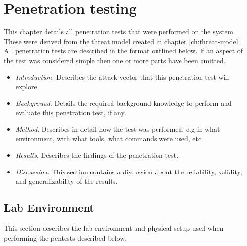 \chapter{Penetration testing} \label{ch:pentesting}
This chapter details all penetration tests that were performed on the system. These were derived from the threat model created in chapter \ref{ch:threat-model}. All penetration tests are described in the format outlined below. If an aspect of the test was considered simple then one or more parts have been omitted.
\begin{itemize}
    \item \textit{Introduction}. Describes the attack vector that this penetration test will explore.
    \item \textit{Background}. Details the required background knowledge to perform and evaluate this penetration test, if any.
    \item \textit{Method}. Describes in detail how the test was performed, e.g in what environment, with what tools, what commands were used, etc.
    \item \textit{Results}. Describes the findings of the penetration test.
    \item \textit{Discussion}. This section contains a discussion about the reliability, validity, and generalizability of the results.
\end{itemize}

\section{Lab Environment} \label{ch:pentesting:lab-setup}
This section describes the lab environment and physical setup used when performing the pentests described below.

